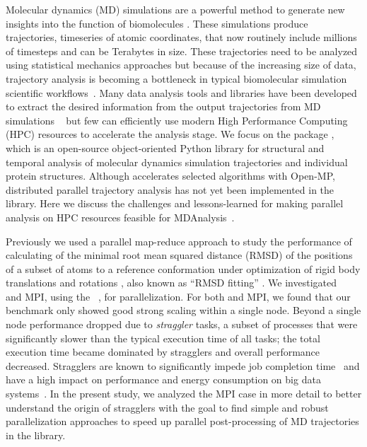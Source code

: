 \label{sec:introduction}
Molecular dynamics (MD) simulations are a powerful method to generate new insights into the function of biomolecules \citep{Borhani:2012mi, Dror:2012cr, Orozco:2014dq, Perilla:2015kx, Bottaro:2018aa}.
These simulations produce trajectories, timeseries of atomic coordinates, that now routinely include millions of timesteps and can be Terabytes in size.
These trajectories need to be analyzed using statistical mechanics approaches \cite{Mura:2014kx} but because of the increasing size of data, trajectory analysis is becoming a bottleneck in typical biomolecular simulation scientific workflows~\cite{Cheatham:2015}.
Many data analysis tools and libraries have been developed to extract the desired information from the output trajectories from MD simulations ~\cite{nmoldyn, nmoldyn-2012, Hum96, Hinsen:2000kx, Grant:2006ud, himach-2008, Romo:2009zr, Romo:2014bh, Michaud-Agrawal:2011fu, Gowers:2016aa, cpptraj-2013, mdtraj-2015, pteros2015, Doerr:2016aa} but few can efficiently use modern High Performance Computing (HPC) resources to accelerate the analysis stage.
We focus on the  package \citep{Gowers:2016aa,Michaud-Agrawal:2011fu}, which is an open-source object-oriented Python library for structural and temporal analysis of molecular dynamics simulation trajectories and individual protein structures.
Although  accelerates selected algorithms with Open-MP, distributed parallel trajectory analysis has not yet been implemented in the library.
Here we discuss the challenges and lessons-learned for making parallel analysis on HPC resources feasible for MDAnalysis~.

Previously we used a parallel map-reduce approach to study the performance of calculating of the minimal root mean squared distance (RMSD) of the positions of a subset of atoms to a reference conformation under optimization of rigid body translations and rotations \cite{Khoshlessan:2017ab, ICCP-2018}, also known as ``RMSD fitting'' \cite{Liu:2010kx, Mura:2014kx}. 
We investigated ~\cite{Rocklin:2015aa} and MPI, using the ~\cite{Dalcin:2011aa, Dalcin:2005aa}, for parallelization. 
For both  and MPI, we found that our benchmark only showed good strong scaling within a single node.
Beyond a single node performance dropped due to \emph{straggler} tasks, a subset of processes that were significantly slower than the typical execution time of all tasks; the total execution time became dominated by stragglers and overall performance decreased.
Stragglers are known to significantly impede job completion time~\cite{Garraghan2016} and have a high impact on performance and energy consumption on big data systems~\cite{Tien-2017}.
In the present study, we analyzed the MPI case in more detail to better understand the origin of stragglers with the goal to find simple and robust parallelization approaches to speed up parallel post-processing of MD trajectories in the  library. 

